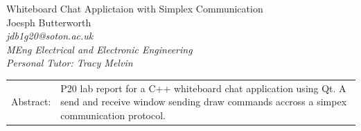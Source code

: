 \documentclass[10pt]{article}
\newcommand{\docTitle}{Whiteboard Chat Applictaion with Simplex Communication}
\newcommand{\docAuthor}{Joesph Butterworth}
\begin{document}

{
    \centering
    \fontsize{28pt}{29.4pt} \selectfont
    \docTitle\\
    \vspace{25pt}
    \fontsize{11pt}{11.55pt}\selectfont
    \docAuthor\\
    \fontsize{10pt}{10.5pt}\selectfont
    \textit{jdb1g20@soton.ac.uk} \\ %
    \textit{MEng Electrical and Electronic Engineering} \\ 
    \textit{Personal Tutor: Tracy Melvin} \\ %
}
\vspace{25pt}

{
\setlength{\tabcolsep}{0cm} %
\centering
\begin{tabular}{p{2cm}p{\textwidth-2cm}}
    Abstract: & P20 lab report for a C++ whiteboard chat application using Qt. A send and receive window sending draw commands accross a simpex communication protocol.
    
\end{tabular}  
}
\vspace{25pt}
\end{document}
